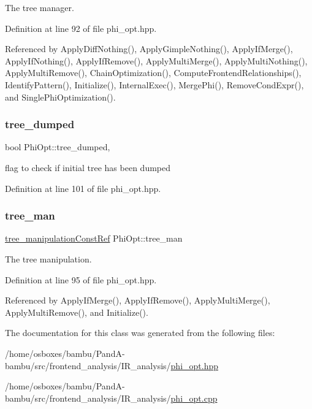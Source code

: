 The tree manager. 



Definition at line 92 of file phi\+\_\+opt.\+hpp.



Referenced by Apply\+Diff\+Nothing(), Apply\+Gimple\+Nothing(), Apply\+If\+Merge(), Apply\+If\+Nothing(), Apply\+If\+Remove(), Apply\+Multi\+Merge(), Apply\+Multi\+Nothing(), Apply\+Multi\+Remove(), Chain\+Optimization(), Compute\+Frontend\+Relationships(), Identify\+Pattern(), Initialize(), Internal\+Exec(), Merge\+Phi(), Remove\+Cond\+Expr(), and Single\+Phi\+Optimization().

\mbox{\label{classPhiOpt_a7515aee0b8a57b866c4d1dacb982a5ea}} 
\subsubsection{\texorpdfstring{tree\+\_\+dumped}{tree\_dumped}}
{\footnotesize\ttfamily bool Phi\+Opt\+::tree\+\_\+dumped\hspace{0.3cm}{\ttfamily [static]}, {\ttfamily [private]}}



flag to check if initial tree has been dumped 



Definition at line 101 of file phi\+\_\+opt.\+hpp.

\mbox{\label{classPhiOpt_a67681ee459d9b87db295f45996b750ff}} 
\subsubsection{\texorpdfstring{tree\+\_\+man}{tree\_man}}
{\footnotesize\ttfamily \hyperlink{tree__manipulation_8hpp_af8a30f3f306569d7681c1b5af9ddd9d0}{tree\+\_\+manipulation\+Const\+Ref} Phi\+Opt\+::tree\+\_\+man\hspace{0.3cm}{\ttfamily [private]}}



The tree manipulation. 



Definition at line 95 of file phi\+\_\+opt.\+hpp.



Referenced by Apply\+If\+Merge(), Apply\+If\+Remove(), Apply\+Multi\+Merge(), Apply\+Multi\+Remove(), and Initialize().



The documentation for this class was generated from the following files\+:\begin{DoxyCompactItemize}
\item 
/home/osboxes/bambu/\+Pand\+A-\/bambu/src/frontend\+\_\+analysis/\+I\+R\+\_\+analysis/\hyperlink{phi__opt_8hpp}{phi\+\_\+opt.\+hpp}\item 
/home/osboxes/bambu/\+Pand\+A-\/bambu/src/frontend\+\_\+analysis/\+I\+R\+\_\+analysis/\hyperlink{phi__opt_8cpp}{phi\+\_\+opt.\+cpp}\end{DoxyCompactItemize}
